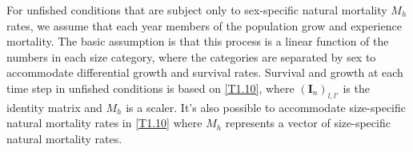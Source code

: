 \documentclass[12pt,letterpaper]{article}
\begin{document}
    For unfished conditions that are subject only to sex-specific natural mortality $M_h$ rates, we assume that each year members of the population grow and experience mortality.  The basic assumption is that this process is a linear function of the numbers in each size category, where the categories are separated by  sex to accommodate differential growth and survival rates.  Survival and growth at each time step in unfished conditions is based on \eqref{T1.10}, where $(\pmb{I}_n)_{l,l'}$ is the identity matrix and $M_h$ is a scaler. It's also possible to accommodate size-specific natural mortality rates in \eqref{T1.10} where $M_h$ represents a vector of size-specific natural mortality rates.



\end{document}
